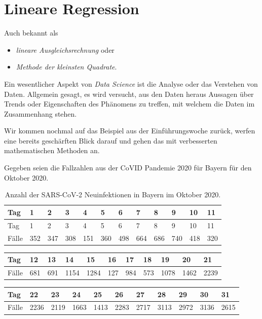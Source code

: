 \documentclass[]{book}
\providecommand{\tightlist}{%
  \setlength{\itemsep}{0pt}\setlength{\parskip}{0pt}}
\theoremstyle{definition}
\theoremstyle{definition}
\theoremstyle{definition}
\theoremstyle{definition}
\theoremstyle{remark}
\begin{document}
\hypertarget{lineare-regression}{%
\chapter{Lineare Regression}\label{lineare-regression}}

Auch bekannt als

\begin{itemize}
\tightlist
\item
  \emph{lineare Ausgleichsrechnung} oder
\item
  \emph{Methode der kleinsten Quadrate}.
\end{itemize}

Ein wesentlicher Aspekt von \emph{Data Science} ist die Analyse oder das
Verstehen von Daten. Allgemein gesagt, es wird versucht, aus den Daten
heraus Aussagen über Trends oder Eigenschaften des Phänomens zu treffen,
mit welchem die Daten im Zusammenhang stehen.

Wir kommen nochmal auf das Beispiel aus der Einführungswoche zurück, werfen eine bereits geschärften Blick darauf und gehen das mit verbesserten mathematischen Methoden an.

Gegeben seien die Fallzahlen aus der CoVID Pandemie 2020 für Bayern für den Oktober 2020.

\hypertarget{tab:covid-cases}{}
\begin{longtable}[]{@{}llllllllllll@{}}
\caption{Anzahl der SARS-CoV-2 Neuinfektionen in Bayern im Oktober 2020.}\tabularnewline
\toprule
Tag & 1 & 2 & 3 & 4 & 5 & 6 & 7 & 8 & 9 & 10 & 11\tabularnewline
\midrule
\endfirsthead
\toprule
Tag & 1 & 2 & 3 & 4 & 5 & 6 & 7 & 8 & 9 & 10 & 11\tabularnewline
\midrule
\endhead
Fälle & 352 & 347 & 308 & 151 & 360 & 498 & 664 & 686 & 740 & 418 & 320\tabularnewline
\bottomrule
\end{longtable}

\begin{longtable}[]{@{}lllllllllll@{}}
\toprule
Tag & 12 & 13 & 14 & 15 & 16 & 17 & 18 & 19 & 20 & 21\tabularnewline
\midrule
\endhead
Fälle & 681 & 691 & 1154 & 1284 & 127 & 984 & 573 & 1078 & 1462 & 2239\tabularnewline
\bottomrule
\end{longtable}

\begin{longtable}[]{@{}lllllllllll@{}}
\toprule
Tag & 22 & 23 & 24 & 25 & 26 & 27 & 28 & 29 & 30 & 31\tabularnewline
\midrule
\endhead
Fälle & 2236 & 2119 & 1663 & 1413 & 2283 & 2717 & 3113 & 2972 & 3136 & 2615\tabularnewline
\bottomrule
\end{longtable}
\end{document}
